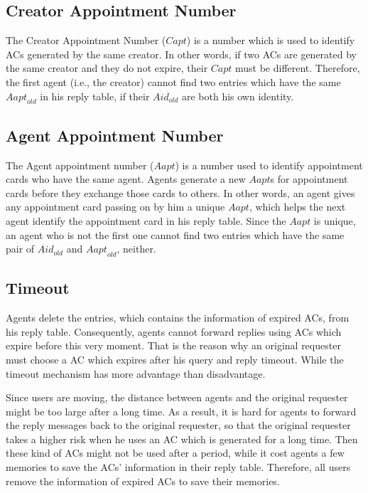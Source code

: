 \subsection{  Creator Appointment Number}

\noindent The Creator Appointment Number ($Capt$) is a number which is used to identify ACs generated by the same creator. In other words, if two ACs are generated by the same creator and they do not expire, their $Capt$ must be different. Therefore, the first agent (i.e., the creator) cannot find two entries which have the same ${Aapt}_{old}$ in his reply table, if their ${Aid}_{old}$ are both his own identity.


\subsection{ Agent Appointment Number}

\noindent The Agent appointment number ($Aapt$) is a number used to identify appointment cards who have the same agent. Agents generate a new $Aapt$s for appointment cards before they exchange those cards to others. In other words, an agent gives any appointment card passing on by him a unique $Aapt$, which helps the next agent identify the appointment card in his reply table. Since the $Aapt$ is unique, an agent who is not the first one cannot find two entries which have the same pair of ${Aid}_{old}$ and ${Aapt}_{old}$, neither.


\subsection{ Timeout}

\noindent Agents delete the entries, which contains the information of expired ACs, from his reply table. Consequently, agents cannot forward replies using ACs which expire before this very moment. That is the reason why an original requester must choose a AC which expires after his query and reply timeout. While the timeout mechanism has more advantage than disadvantage.

Since users are moving, the distance between agents and the original requester might be too large after a long time. As a result, it is hard for agents to forward the reply messages back to the original requester, so that the original requester takes a higher risk when he uses an AC which is generated for a long time. Then these kind of ACs might not be used after a period, while it cost agents a few memories to save the ACs' information in their reply table. Therefore, all users remove the information of expired ACs to save their memories.

